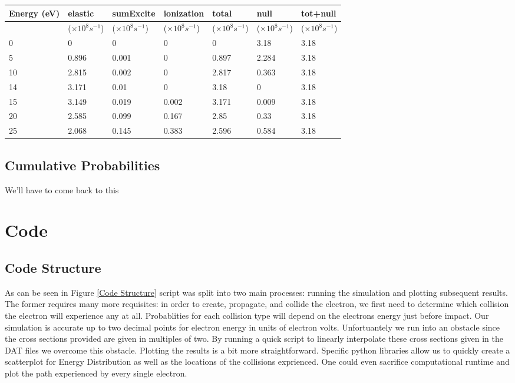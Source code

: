 \documentclass[12pt]{article}
\begin{document}
\begin{table}[h]
	\centering
	\begin{tabular}{|l|l|l|l|l|l|l|}
		\hline
		Energy (eV) & elastic & sumExcite & ionization & total & null & tot+null \\ \hline
		& ($\times10^8 s^{-1}$) & ($\times10^8 s^{-1}$) & ($\times10^8 s^{-1}$) & ($\times10^8 s^{-1}$) & ($\times10^8 s^{-1}$) & ($\times10^8 s^{-1}$) \\ \hline
		0 & 0 & 0 & 0 & 0 & 3.18 & 3.18 \\ \hline
		5 & 0.896 & 0.001 & 0 & 0.897 & 2.284 & 3.18 \\ \hline
		10 & 2.815 & 0.002 & 0 & 2.817 & 0.363 & 3.18 \\ \hline
		14 & 3.171 & 0.01 & 0 & \cellcolor{yellow!25}3.18 & 0 & 3.18 \\ \hline
		15 & 3.149 & 0.019 & 0.002 & 3.171 & 0.009 & 3.18 \\ \hline
		20 & 2.585 & 0.099 & 0.167 & 2.85 & 0.33 & 3.18 \\ \hline
		25 & 2.068 & 0.145 & 0.383 & 2.596 & 0.584 & 3.18 \\ \hline
	\end{tabular}
\end{table}


\subsection{Cumulative Probabilities}
We'll have to come back to this

\section{Code}
\subsection{Code Structure}
As can be seen in Figure \ref{Code Structure} script was split into two main processes: running the simulation and plotting subsequent 
results. The former requires many more 
requisites: in order to create, propagate, and collide the electron, we first need to determine which collision the electron will experience 
any at all. Probablities for each collision type will depend on the electrons energy just before impact. Our simulation is accurate up to 
two decimal points for electron energy in units of electron volts. Unfortuantely we run into an obstacle since the cross sections 
provided are given in multiples of two. By running a quick script to linearly interpolate these cross sections given in the DAT files we 
overcome this obstacle. Plotting the results is a bit more straightforward. Specific python libraries allow us to quickly create a 
scatterplot for Energy Distribution as well as the locations of the collisions exprienced. One could even sacrifice computational runtime 
and plot the path experienced by every single electron.
\end{document}
